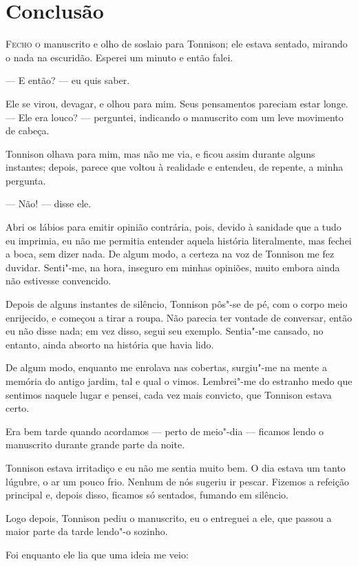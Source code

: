 \clearpage

\chapter{Conclusão}

\textsc{Fecho o} manuscrito e olho de soslaio para Tonnison; ele estava sentado, mirando o nada na escuridão. Esperei um
minuto e então falei.

--- E então? --- eu quis saber.

Ele se virou, devagar, e olhou para mim. Seus pensamentos pareciam estar longe. --- Ele era louco? --- perguntei, indicando o
manuscrito com um leve movimento de cabeça.

Tonnison olhava para mim, mas não me via, e ficou assim durante alguns instantes; depois, parece que voltou à realidade e
entendeu, de repente, a minha pergunta.

--- Não! --- disse ele.

Abri os lábios para emitir opinião contrária, pois, devido à sanidade que a tudo eu imprimia, eu não me permitia
entender aquela história literalmente, mas fechei a boca, sem dizer nada. De algum modo, a certeza na voz de Tonnison
me fez duvidar. Senti"-me, na hora, inseguro em minhas opiniões, muito embora ainda não estivesse convencido.

Depois de alguns instantes de silêncio, Tonnison pôs"-se de pé, com o corpo meio enrijecido, e começou a tirar a roupa.
Não parecia ter vontade de conversar, então eu não disse nada; em vez disso, segui seu exemplo. Sentia"-me cansado, no
entanto, ainda absorto na história que havia lido.

De algum modo, enquanto me enrolava nas cobertas, surgiu"-me na mente a memória do antigo jardim, tal e qual o vimos.
Lembrei"-me do estranho medo que sentimos naquele lugar e pensei, cada vez mais convicto, que Tonnison estava
certo.

Era bem tarde quando acordamos --- perto de meio"-dia --- ficamos lendo o manuscrito durante grande parte da noite.

Tonnison estava irritadiço e eu não me sentia muito bem. O dia estava um tanto lúgubre, o ar um pouco frio. Nenhum de
nós sugeriu ir pescar. Fizemos a refeição principal e, depois disso, ficamos só sentados, fumando em silêncio.

Logo depois, Tonnison pediu o manuscrito, eu o entreguei a ele, que passou a maior parte da tarde lendo"-o sozinho.

Foi enquanto ele lia que uma ideia me veio:

